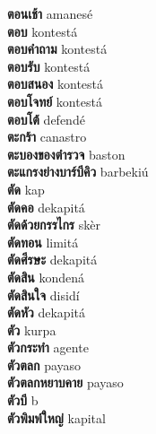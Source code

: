 \textbf{ ตอนเช้า  } amanesé \\
\textbf{ ตอบ  } kontestá \\
\textbf{ ตอบคำถาม  } kontestá \\
\textbf{ ตอบรับ  } kontestá \\
\textbf{ ตอบสนอง  } kontestá \\
\textbf{ ตอบโจทย์  } kontestá \\
\textbf{ ตอบโต้  } defendé \\
\textbf{ ตะกร้า  } canastro \\
\textbf{ ตะบองของตำรวจ  } baston \\
\textbf{ ตะแกรงย่างบาร์บีคิว  } barbekiú \\
\textbf{ ตัด  } kap \\
\textbf{ ตัดคอ  } dekapitá \\
\textbf{ ตัดด้วยกรรไกร  } skèr \\
\textbf{ ตัดทอน  } limitá \\
\textbf{ ตัดศีรษะ  } dekapitá \\
\textbf{ ตัดสิน  } kondená \\
\textbf{ ตัดสินใจ  } disidí \\
\textbf{ ตัดหัว  } dekapitá \\
\textbf{ ตัว  } kurpa \\
\textbf{ ตัวกระทำ  } agente \\
\textbf{ ตัวตลก  } payaso \\
\textbf{ ตัวตลกหยาบคาย  } payaso \\
\textbf{ ตัวบี  } b \\
\textbf{ ตัวพิมพ์ใหญ่  } kapital \\
